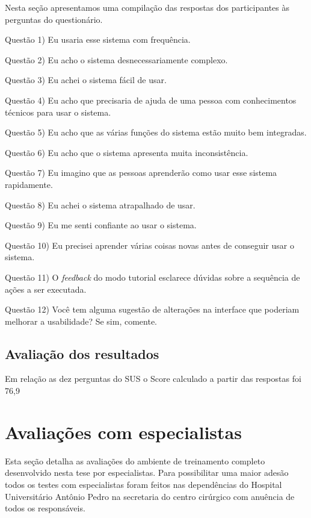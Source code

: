 Nesta seção apresentamos uma compilação das respostas dos participantes às perguntas do questionário.

Questão 1) Eu usaria esse sistema com frequência.

Questão 2) Eu acho o sistema desnecessariamente complexo.

Questão 3) Eu achei o sistema fácil de usar.

Questão 4) Eu acho que precisaria de ajuda de uma pessoa com conhecimentos técnicos para usar o sistema.

Questão 5) Eu acho que as várias funções do sistema estão muito bem integradas.

Questão 6) Eu acho que o sistema apresenta muita inconsistência.

Questão 7) Eu imagino que as pessoas aprenderão como usar esse sistema rapidamente.

Questão 8) Eu achei o sistema atrapalhado de usar.

Questão 9) Eu me senti confiante ao usar o sistema.

Questão 10) Eu precisei aprender várias coisas novas antes de conseguir usar o sistema.

Questão 11) O \textit{feedback} do modo tutorial esclarece dúvidas sobre a sequência de ações a ser executada.

Questão 12) Você tem alguma sugestão de alterações na interface que poderiam melhorar a usabilidade? Se sim, comente.

\subsection{Avaliação dos resultados}
\label{sec:avaliacaoUsabilidde}

Em relação as dez perguntas do \acrshort{SUS} o Score calculado a partir das respostas foi 76,9

\section{Avaliações com especialistas}
\label{sec:testeEspecialistas}

Esta seção detalha as avaliações do ambiente de treinamento completo desenvolvido nesta tese por especialistas. Para possibilitar uma maior adesão todos os testes com especialistas foram feitos nas dependências do Hospital Universitário Antônio Pedro na secretaria do centro cirúrgico com anuência de todos os responsáveis.


